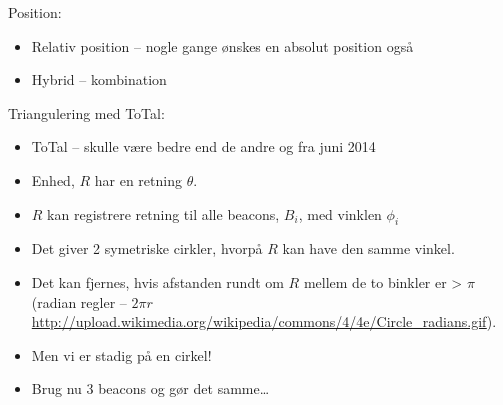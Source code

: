 \documentclass[oneside, 10pt]{article}
\begin{document}
Position:
\begin{itemize}
	\item Relativ position -- nogle gange ønskes en absolut position også
	\item Hybrid -- kombination
\end{itemize}

Triangulering med ToTal:
\begin{itemize}
	\item ToTal -- skulle være bedre end de andre og fra juni 2014
	\item Enhed, $R$ har en retning $\theta$. 
	\item $R$ kan registrere retning til alle beacons, $B_i$, med vinklen $\phi_i$
	\item Det giver 2 symetriske cirkler, hvorpå $R$ kan have den samme vinkel.
	\item Det kan fjernes, hvis afstanden rundt om $R$ mellem de to binkler er > $\pi$ (radian regler -- $2\pi r$ \url{http://upload.wikimedia.org/wikipedia/commons/4/4e/Circle_radians.gif}).
	\item[] Men vi er stadig på en cirkel!

	\item Brug nu 3 beacons og gør det samme\dots
\end{itemize}
\end{document}

